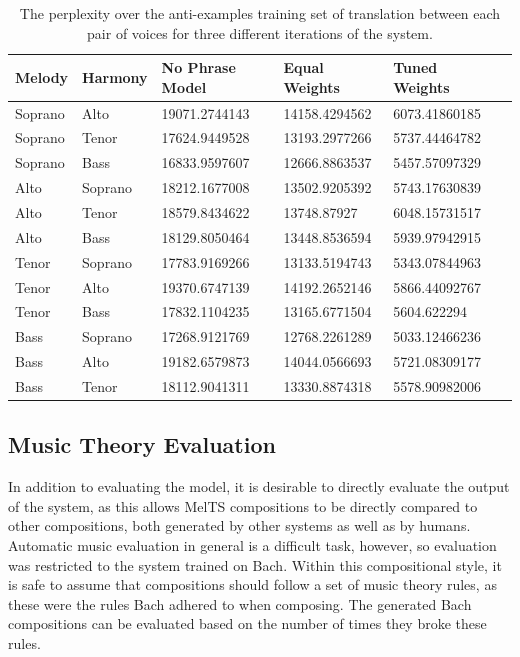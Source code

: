 \documentclass{sig-alternate}
\begin{document}
\begin{table}[t]
      \begin{tabular}{| l | l | l | l | l | l |}
      \hline
     Melody & Harmony & No Phrase Model & Equal Weights & Tuned Weights \\ \hline
     Soprano & Alto & 19071.2744143 & 14158.4294562 & 6073.41860185 \\ 
     Soprano & Tenor & 17624.9449528 & 13193.2977266 & 5737.44464782 \\ 
     Soprano & Bass & 16833.9597607 & 12666.8863537 & 5457.57097329 \\ 
     Alto & Soprano & 18212.1677008 & 13502.9205392 & 5743.17630839 \\ 
     Alto & Tenor & 18579.8434622 & 13748.87927 & 6048.15731517 \\ 
     Alto & Bass & 18129.8050464 & 13448.8536594 & 5939.97942915 \\ 
     Tenor & Soprano & 17783.9169266 & 13133.5194743 & 5343.07844963 \\ 
     Tenor & Alto & 19370.6747139 & 14192.2652146 & 5866.44092767 \\ 
     Tenor & Bass & 17832.1104235 & 13165.6771504 & 5604.622294 \\ 
     Bass & Soprano & 17268.9121769 & 12768.2261289 & 5033.12466236\\ 
     Bass & Alto & 19182.6579873 & 14044.0566693 & 5721.08309177 \\ 
     Bass & Tenor & 18112.9041311 & 13330.8874318 & 5578.90982006 \\ \hline
        \end{tabular}
  \caption{The perplexity over the anti-examples training set of translation between each pair of voices for three different iterations of the system.}
\end{table}


\subsection{Music Theory Evaluation}

In addition to evaluating the model, it is desirable to directly evaluate the output of the system, as this allows MelTS compositions to be directly compared to other compositions, both generated by other systems as well as by humans. Automatic music evaluation in general is a difficult task, however, so evaluation was restricted to the system trained on Bach. Within this compositional style, it is safe to assume that compositions should follow a set of music theory rules, as these were the rules Bach adhered to when composing. The generated Bach compositions can be evaluated based on the number of times they broke these rules.
\end{document}
